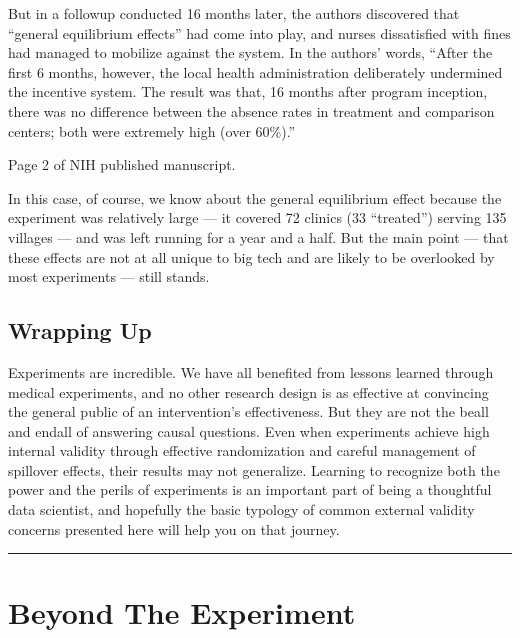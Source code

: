 \documentclass[letterpaper,10pt,english]{jupyterBook}
\begin{document}
\sphinxAtStartPar
But in a follow\sphinxhyphen{}up conducted 16 months later, the authors discovered that “general equilibrium effects” had come into play, and nurses dissatisfied with fines had managed to mobilize against the system. In the authors’ words, “After the first 6 months, however, the local health administration deliberately undermined the incentive system. The result was that, 16 months after program inception, there was no difference between the absence rates in treatment and comparison centers; both were extremely high (over 60\%).”%
\begin{footnote}[3]\sphinxAtStartFootnote
Page 2 of NIH published manuscript.
%
\end{footnote}

\sphinxAtStartPar
In this case, of course, we know about the general equilibrium effect because the experiment was relatively large — it covered 72 clinics (33 “treated”) serving 135 villages — and was left running for a year and a half. But the main point — that these effects are not at all unique to big tech and are likely to be overlooked by most experiments — still stands.


\section{Wrapping Up}
\label{\detokenize{30_questions/45_causal_questions_external:wrapping-up}}
\sphinxAtStartPar
Experiments are incredible. We have all benefited from lessons learned through medical experiments, and no other research design is as effective at convincing the general public of an intervention’s effectiveness. But they are not the be\sphinxhyphen{}all and end\sphinxhyphen{}all of answering causal questions. Even when experiments achieve high internal validity through effective randomization and careful management of spillover effects, their results may not generalize. Learning to recognize both the power and the perils of experiments is an important part of being a thoughtful data scientist, and hopefully the basic typology of common external validity concerns presented here will help you on that journey.


\bigskip\hrule\bigskip


\sphinxstepscope


\chapter{Beyond The Experiment}
\label{\detokenize{30_questions/50_causal_beyond_ab:beyond-the-experiment}}\label{\detokenize{30_questions/50_causal_beyond_ab::doc}}
\sphinxAtStartPar
{}
\end{document}
